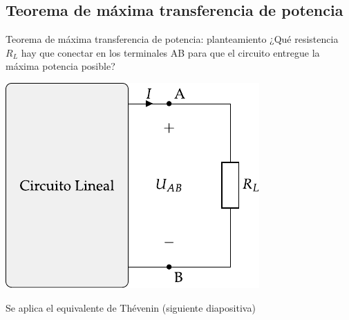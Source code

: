 \documentclass[aspectratio=169, xcolor={usenames,svgnames,dvipsnames}]{beamer}
\begin{document}

%
%    


\subsection{Teorema de máxima transferencia de potencia}

\begin{frame}{Teorema de máxima transferencia de potencia: \hspace{4mm}planteamiento}
    ¿Qué resistencia \(R_L\) hay que conectar en los terminales AB para que el circuito entregue la \alert{máxima potencia posible}?
    
    \begin{center}
        \includegraphics[height=0.55\textheight]{../figs/thevenin_continua_red.pdf}
    \end{center}
    
    Se aplica el \alert{equivalente de Thévenin} (siguiente diapositiva)
\end{frame}

\end{document}
